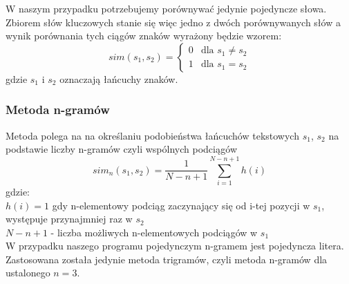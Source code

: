 \documentclass{classrep}
\begin{document}
{{{                W naszym przypadku potrzebujemy porównywać jedynie pojedyncze słowa. Zbiorem słów kluczowych stanie się
                więc jedno z dwóch porównywanych słów a wynik porównania tych ciągów znaków wyrażony będzie wzorem:
                \begin{equation}
                    sim(s_1, s_2) = \left\{ \begin{array}{ll}
                                                0 & \textrm{dla $s_1 \ne s_2$}\\
                                                1 & \textrm{dla $s_1 = s_2$}
                    \end{array}\right.
                \end{equation}
                gdzie $s_1$ i $s_2$ oznaczają łańcuchy znaków.
            }

            \subsubsection{Metoda n-gramów} \label{ngram} {
                Metoda polega na na określaniu podobieństwa łańcuchów tekstowych $s_1$, $s_2$
                na podstawie liczby n-gramów czyli wspólnych podciągów
                \begin{equation}
                    sim_n(s_1, s_2)=\frac{1}{N-n+1}\sum_{i=1}^{N-n+1} h(i)
                \end{equation}
                gdzie:\\
                $h(i)=1$ gdy n-elementowy podciąg zaczynający się od i-tej pozycji w $s_1$,
                występuje przynajmniej raz w $s_2$\\
                $N-n+1$ - liczba możliwych n-elementowych podciągów w $s_1$ \\

                W przypadku naszego programu pojedynczym n-gramem jest pojedyncza litera. Zastosowana
                została jedynie metoda trigramów, czyli metoda n-gramów dla ustalonego $n = 3$.
            }

}}
\end{document}
